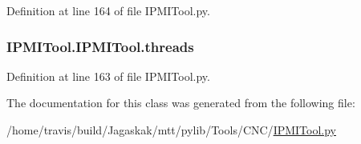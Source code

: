Definition at line 164 of file I\-P\-M\-I\-Tool.\-py.

\hypertarget{classIPMITool_1_1IPMITool_a2f6ca8b0b509ba2c514b72312841b2d6}{
\subsubsection[{threads}]{\setlength{\rightskip}{0pt plus 5cm}I\-P\-M\-I\-Tool.\-I\-P\-M\-I\-Tool.\-threads}}\label{classIPMITool_1_1IPMITool_a2f6ca8b0b509ba2c514b72312841b2d6}


Definition at line 163 of file I\-P\-M\-I\-Tool.\-py.



The documentation for this class was generated from the following file\-:\begin{DoxyCompactItemize}
\item 
/home/travis/build/\-Jagaskak/mtt/pylib/\-Tools/\-C\-N\-C/\hyperlink{IPMITool_8py}{I\-P\-M\-I\-Tool.\-py}\end{DoxyCompactItemize}
